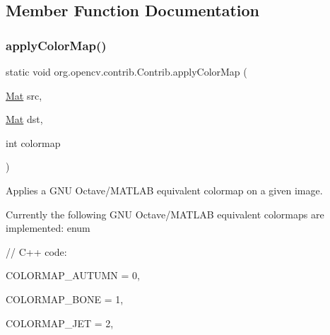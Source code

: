 \subsection{Member Function Documentation}
\mbox{\label{classorg_1_1opencv_1_1contrib_1_1_contrib_a58729ce6ba4fd94066f5f6b18ae2543b}} 
\subsubsection{\texorpdfstring{apply\+Color\+Map()}{applyColorMap()}}
{\footnotesize\ttfamily static void org.\+opencv.\+contrib.\+Contrib.\+apply\+Color\+Map (\begin{DoxyParamCaption}\item[{\mbox{\hyperlink{classorg_1_1opencv_1_1core_1_1_mat}{Mat}}}]{src,  }\item[{\mbox{\hyperlink{classorg_1_1opencv_1_1core_1_1_mat}{Mat}}}]{dst,  }\item[{int}]{colormap }\end{DoxyParamCaption})\hspace{0.3cm}{\ttfamily [static]}}

Applies a G\+NU Octave/\+M\+A\+T\+L\+AB equivalent colormap on a given image.

Currently the following G\+NU Octave/\+M\+A\+T\+L\+AB equivalent colormaps are implemented\+: enum {\ttfamily }

{\ttfamily }

{\ttfamily }

{\ttfamily // C++ code\+:}

{\ttfamily }

{\ttfamily }

{\ttfamily C\+O\+L\+O\+R\+M\+A\+P\+\_\+\+A\+U\+T\+U\+MN = 0,}

{\ttfamily }

{\ttfamily }

{\ttfamily C\+O\+L\+O\+R\+M\+A\+P\+\_\+\+B\+O\+NE = 1,}

{\ttfamily }

{\ttfamily }

{\ttfamily C\+O\+L\+O\+R\+M\+A\+P\+\_\+\+J\+ET = 2,}

{\ttfamily }

